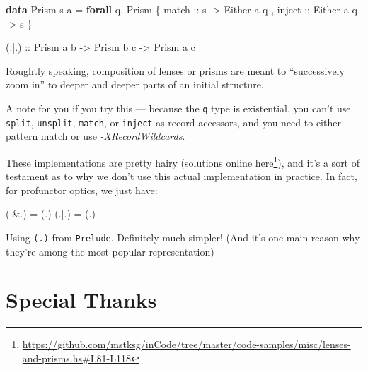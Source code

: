 \documentclass[]{article}
\newenvironment{Shaded}{}{}
\newcommand{\DataTypeTok}[1]{\textcolor[rgb]{0.56,0.13,0.00}{#1}}
\newcommand{\KeywordTok}[1]{\textcolor[rgb]{0.00,0.44,0.13}{\textbf{#1}}}
\newcommand{\NormalTok}[1]{#1}
\newcommand{\OperatorTok}[1]{\textcolor[rgb]{0.40,0.40,0.40}{#1}}
\newcommand{\OtherTok}[1]{\textcolor[rgb]{0.00,0.44,0.13}{#1}}
\renewcommand{\href}[2]{#2\footnote{\url{#1}}}
\begin{document}
\begin{itemize}
\begin{Shaded}
\begin{Highlighting}[]
\KeywordTok{data} \DataTypeTok{Prism\textquotesingle{}}\NormalTok{ s a }\OtherTok{=} \KeywordTok{forall}\NormalTok{ q}\OperatorTok{.} \DataTypeTok{Prism\textquotesingle{}}
\NormalTok{    \{}\OtherTok{ match  ::}\NormalTok{ s }\OtherTok{{-}>} \DataTypeTok{Either}\NormalTok{ a q}
\NormalTok{    ,}\OtherTok{ inject ::} \DataTypeTok{Either}\NormalTok{ a q }\OtherTok{{-}>}\NormalTok{ s}
\NormalTok{    \}}

\OtherTok{(.|.) ::} \DataTypeTok{Prism\textquotesingle{}}\NormalTok{ a b}
      \OtherTok{{-}>} \DataTypeTok{Prism\textquotesingle{}}\NormalTok{ b c}
      \OtherTok{{-}>} \DataTypeTok{Prism\textquotesingle{}}\NormalTok{ a c}
\end{Highlighting}
\end{Shaded}

  Roughtly speaking, composition of lenses or prisms are meant to ``successively
  zoom in'' to deeper and deeper parts of an initial structure.

  A note for you if you try this --- because the \texttt{q} type is existential,
  you can't use \texttt{split}, \texttt{unsplit}, \texttt{match}, or
  \texttt{inject} as record accessors, and you need to either pattern match or
  use \emph{-XRecordWildcards}.

  These implementations are pretty hairy (solutions
  \href{https://github.com/mstksg/inCode/tree/master/code-samples/misc/lenses-and-prisms.hs\#L81-L118}{online
  here}), and it's a sort of testament as to why we don't use this actual
  implementation in practice. In fact, for profunctor optics, we just have:

\begin{Shaded}
\begin{Highlighting}[]
\NormalTok{(}\OperatorTok{.\&.}\NormalTok{) }\OtherTok{=}\NormalTok{ (}\OperatorTok{.}\NormalTok{)}
\NormalTok{(}\OperatorTok{.|.}\NormalTok{) }\OtherTok{=}\NormalTok{ (}\OperatorTok{.}\NormalTok{)}
\end{Highlighting}
\end{Shaded}

  Using \texttt{(.)} from \texttt{Prelude}. Definitely much simpler! (And it's
  one main reason why they're among the most popular representation)
\end{itemize}

\hypertarget{special-thanks}{%
\section{Special Thanks}\label{special-thanks}}
\end{document}
